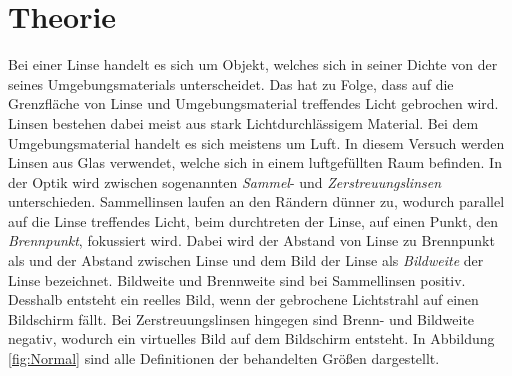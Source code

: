 
\section{Theorie}
\label{sec:Theorie}
Bei einer Linse handelt es sich um Objekt, welches sich in seiner Dichte von der seines Umgebungsmaterials unterscheidet. Das hat zu Folge, dass auf die Grenzfläche von Linse und Umgebungsmaterial treffendes Licht gebrochen wird. Linsen bestehen dabei meist aus stark Lichtdurchlässigem Material. Bei dem Umgebungsmaterial handelt es sich meistens um Luft. In diesem Versuch werden Linsen aus Glas verwendet, welche sich in einem luftgefüllten Raum befinden. In der Optik wird zwischen sogenannten \textit{Sammel}- und \textit{Zerstreuungslinsen} unterschieden. Sammellinsen laufen an den Rändern dünner zu, wodurch parallel auf die Linse treffendes Licht, beim durchtreten der Linse, auf einen Punkt, den \textit{Brennpunkt}, fokussiert wird. Dabei wird der Abstand von Linse zu Brennpunkt als  und der Abstand zwischen Linse und dem Bild der Linse als \textit{Bildweite} der Linse bezeichnet. Bildweite und Brennweite sind bei Sammellinsen positiv. Desshalb entsteht ein reelles Bild, wenn der gebrochene Lichtstrahl auf einen Bildschirm fällt. Bei Zerstreuungslinsen hingegen sind Brenn- und Bildweite negativ, wodurch ein virtuelles Bild auf dem Bildschirm entsteht. In Abbildung \ref{fig:Normal} sind alle Definitionen der behandelten Größen dargestellt. 

